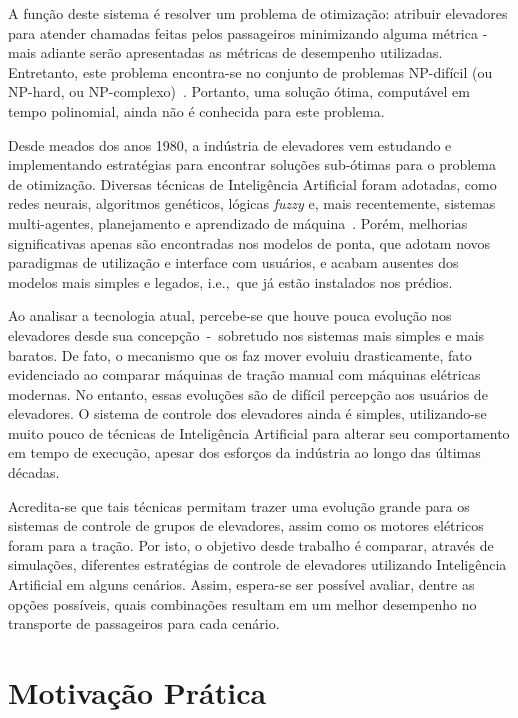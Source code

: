 A função deste sistema é resolver um problema de otimização: atribuir elevadores
para atender chamadas feitas pelos passageiros minimizando alguma métrica - mais
adiante serão apresentadas as métricas de desempenho utilizadas. Entretanto,
este problema encontra-se no conjunto de problemas NP-difícil (ou NP-hard, ou
NP-complexo)~\cite{SeKo99}. Portanto, uma solução ótima, computável em tempo
polinomial, ainda não é conhecida para este problema.

Desde meados dos anos 1980, a indústria de elevadores vem estudando e
implementando estratégias para encontrar soluções sub-ótimas para o problema de
otimização. Diversas técnicas de Inteligência Artificial foram adotadas, como
redes neurais, algoritmos genéticos, lógicas \textit{fuzzy} e, mais
recentemente, sistemas multi-agentes, planejamento e aprendizado de
máquina~\cite{KOEHLEROTTIGER02}. Porém, melhorias significativas apenas são
encontradas nos modelos de ponta, que adotam novos paradigmas de utilização e
interface com usuários, e acabam ausentes dos modelos mais simples e
legados, i.e.,~que já estão instalados nos prédios.

Ao analisar a tecnologia atual, percebe-se que houve pouca evolução nos
elevadores desde sua concepção~-~sobretudo nos sistemas mais simples e mais
baratos. De fato, o mecanismo que os faz mover evoluiu drasticamente, fato
evidenciado ao comparar máquinas de tração manual com máquinas elétricas
modernas. No entanto, essas evoluções são de difícil percepção aos usuários de
elevadores. O sistema de controle dos elevadores ainda é simples, utilizando-se
muito pouco de técnicas de Inteligência Artificial para alterar seu
comportamento em tempo de execução, apesar dos esforços da indústria ao longo
das últimas décadas.

Acredita-se que tais técnicas permitam trazer uma evolução grande para os
sistemas de controle de grupos de elevadores, assim como os motores elétricos
foram para a tração. Por isto, o objetivo desde trabalho é comparar, através de
simulações, diferentes estratégias de controle de elevadores utilizando
Inteligência Artificial em alguns cenários. Assim, espera-se ser possível
avaliar, dentre as opções possíveis, quais combinações resultam em um melhor
desempenho no transporte de passageiros para cada cenário.

\section{\label{section:motivation}Motivação Prática}

